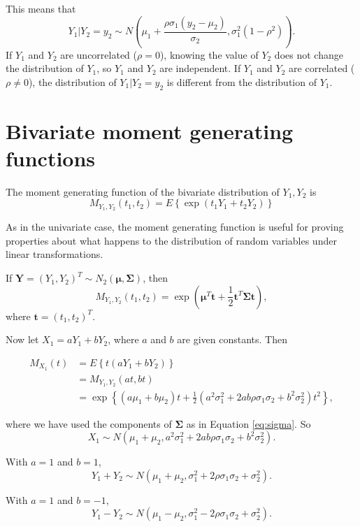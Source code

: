 \documentclass[]{book}
\theoremstyle{definition}
\theoremstyle{definition}
\theoremstyle{definition}
\theoremstyle{remark}
\let\BeginKnitrBlock\begin \let\EndKnitrBlock\end
\begin{document}
This means that
\[Y_1 | Y_2 = y_2 \sim N\left(\mu_1 + \frac{\rho \sigma_1(y_2 - \mu_2)}{\sigma_2},
  \sigma_1^2 (1 - \rho^2)\right).\] If \(Y_1\) and \(Y_2\) are
uncorrelated (\(\rho = 0\)), knowing the value of \(Y_2\) does not
change the distribution of \(Y_1\), so \(Y_1\) and \(Y_2\) are
independent. If \(Y_1\) and \(Y_2\) are correlated (\(\rho \not = 0\)),
the distribution of \(Y_1 | Y_2 = y_2\) is different from the
distribution of \(Y_1\).

\section{Bivariate moment generating
functions}\label{bivariate-moment-generating-functions}

\BeginKnitrBlock{definition}
\protect\hypertarget{def:unnamed-chunk-70}{}{\label{def:unnamed-chunk-70}
}The moment generating function of the bivariate distribution of
\(Y_1, Y_2\) is
\[M_{Y_1, Y_2}(t_1, t_2) = E\left\{\exp(t_1 Y_1 + t_2 Y_2) \right\}\]
\EndKnitrBlock{definition} As in the univariate case, the moment
generating function is useful for proving properties about what happens
to the distribution of random variables under linear transformations.

\BeginKnitrBlock{example}[Bivariate normal mgf]
\protect\hypertarget{exm:bvnmgf}{}{\label{exm:bvnmgf} \iffalse (Bivariate
normal mgf) \fi{} }If
\(\bm Y = (Y_1, Y_2)^T \sim N_2(\bm \mu, \bm \Sigma)\), then
\[M_{Y_1, Y_2}(t_1, t_2) = \exp(\bm \mu^T \bm t + \frac{1}{2} \bm t^T \bm \Sigma \bm t),\]
where \(\bm t = (t_1, t_2)^T\).

Now let \(X_1 = a Y_1 + b Y_2\), where \(a\) and \(b\) are given
constants. Then

\begin{align*}
M_{X_1}(t) &= E \left\{ t(a Y_1 + b Y_2) \right\} \\
&= M_{Y_1, Y_2}(at, bt) \\
&= \exp\left\{(a \mu_1 + b \mu_2) t + \frac{1}{2} (a^2 \sigma_1^2 + 2 a b \rho \sigma_1\sigma_2 + b^2 \sigma_2^2) t^2\right\},
\end{align*}

where we have used the components of \(\bm \Sigma\) as in Equation
\eqref{eq:sigma}. So
\[X_1 \sim N(\mu_1 + \mu_2, a^2 \sigma_1^2 + 2 a b \rho\sigma_1 \sigma_2 + b^2 \sigma_2^2).\]

With \(a = 1\) and \(b = 1\),
\[Y_1 + Y_2 \sim  N(\mu_1 + \mu_2, \sigma_1^2 + 2 \rho\sigma_1 \sigma_2 + \sigma_2^2).\]

With \(a = 1\) and \(b = -1\),
\[Y_1 - Y_2 \sim N(\mu_1 - \mu_2, \sigma_1^2 - 2 \rho \sigma_1 \sigma_2 + \sigma_2^2).\]
\EndKnitrBlock{example}
\end{document}
